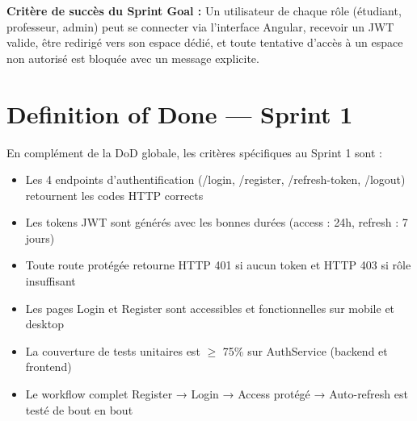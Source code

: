 \documentclass[12pt,a4paper]{report}
\begin{document}
\begin{center}
\end{center}

\textbf{Critère de succès du Sprint Goal :} Un utilisateur de chaque rôle (étudiant, professeur, admin) peut se connecter via l'interface Angular, recevoir un JWT valide, être redirigé vers son espace dédié, et toute tentative d'accès à un espace non autorisé est bloquée avec un message explicite.

\section{Definition of Done — Sprint 1}

En complément de la DoD globale, les critères spécifiques au Sprint 1 sont :

\begin{itemize}[itemsep=0.4em]
    \item  Les 4 endpoints d'authentification (/login, /register, /refresh-token, /logout) retournent les codes HTTP corrects
    \item  Les tokens JWT sont générés avec les bonnes durées (access : 24h, refresh : 7 jours)
    \item  Toute route protégée retourne HTTP 401 si aucun token et HTTP 403 si rôle insuffisant
    \item  Les pages Login et Register sont accessibles et fonctionnelles sur mobile et desktop
    \item  La couverture de tests unitaires est $\geq$ 75\% sur AuthService (backend et frontend)
    \item  Le workflow complet Register → Login → Access protégé → Auto-refresh est testé de bout en bout
\end{itemize}
\end{document}
